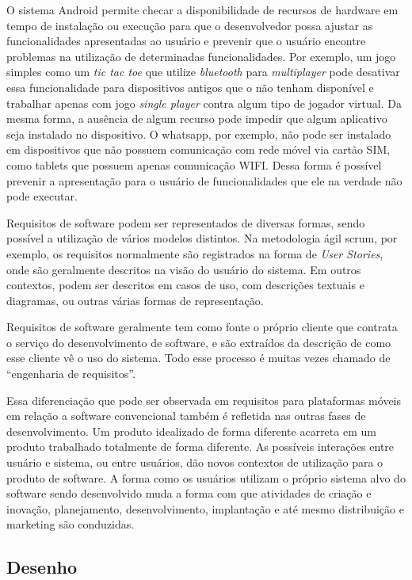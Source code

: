 O sistema Android permite checar a disponibilidade de recursos de hardware em tempo de instalação ou execução para que o desenvolvedor possa ajustar as funcionalidades apresentadas ao usuário e prevenir que o usuário encontre problemas na utilização de determinadas funcionalidades. Por exemplo, um jogo simples como um \textit{tic tac toe} que utilize \textit{bluetooth} para \textit{multiplayer} pode desativar essa funcionalidade para dispositivos antigos que o não tenham disponível e trabalhar apenas com jogo \textit{single player} contra algum tipo de jogador virtual. Da mesma forma, a ausência de algum recurso pode impedir que algum aplicativo seja instalado no dispositivo. O whatsapp, por exemplo, não pode ser instalado em dispositivos que não possuem comunicação com rede móvel via cartão SIM, como tablets que possuem apenas comunicação WIFI. Dessa forma é possível prevenir a apresentação para o usuário de funcionalidades que ele na verdade não pode executar.

Requisitos de software podem ser representados de diversas formas, sendo possível a utilização de vários modelos distintos. Na metodologia ágil scrum, por exemplo, os requisitos normalmente são registrados na forma de \textit{User Stories}, onde são geralmente descritos na visão do usuário do sistema. Em outros contextos, podem ser descritos em casos de uso, com descrições textuais e diagramas, ou outras várias formas de representação.

Requisitos de software geralmente tem como fonte o próprio cliente que contrata o serviço do desenvolvimento de software, e são extraídos da descrição de como esse cliente vê o uso do sistema. Todo esse processo é muitas vezes chamado de ``engenharia de requisitos''. 

Essa diferenciação que pode ser observada em requisitos para plataformas móveis em relação a software convencional também é refletida nas outras fases de desenvolvimento. Um produto idealizado de forma diferente acarreta em um produto trabalhado totalmente de forma diferente. As possíveis interações entre usuário e sistema, ou entre usuários, dão novos contextos de utilização para o produto de software. A forma como os usuários utilizam o próprio sistema alvo do software sendo desenvolvido muda a forma com que atividades de criação e inovação, planejamento, desenvolvimento, implantação e até mesmo distribuição e marketing são conduzidas.

\subsection{Desenho}

